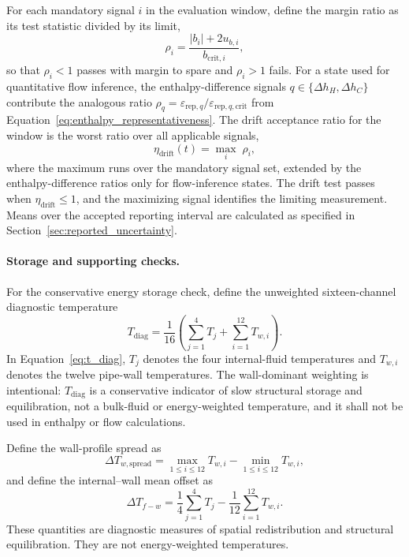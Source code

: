 \documentclass[11pt]{article}
\newcommand{\Tdiag}{T_{\mathrm{diag}}}
\begin{document}
For each mandatory signal $i$ in the evaluation window, define the margin
ratio as its test statistic divided by its limit,
\begin{equation}
    \rho_i
    =
    \frac{|b_i|+2u_{b,i}}{b_{\mathrm{crit},i}},
    \label{eq:margin_ratio}
\end{equation}
so that $\rho_i<1$ passes with margin to spare and $\rho_i>1$ fails. For a
state used for quantitative flow inference, the enthalpy-difference signals
$q\in\{\Delta h_H,\Delta h_C\}$ contribute the analogous ratio
$\rho_q=\varepsilon_{\mathrm{rep},q}/\varepsilon_{\mathrm{rep},q,\mathrm{crit}}$
from Equation~\eqref{eq:enthalpy_representativeness}. The drift acceptance
ratio for the window is the worst ratio over all applicable signals,
\begin{equation}
    \eta_{\mathrm{drift}}(t)
    =
    \max_{i}\;\rho_i,
    \label{eq:accept_ratio}
\end{equation}
where the maximum runs over the mandatory signal set, extended by the
enthalpy-difference ratios only for flow-inference states. The drift test
passes when $\eta_{\mathrm{drift}}\leq1$, and the maximizing signal
identifies the limiting measurement. Means over the accepted reporting
interval are calculated as specified in Section~\ref{sec:reported_uncertainty}.

\paragraph{Storage and supporting checks.}
For the conservative energy storage check, define the unweighted sixteen-channel diagnostic temperature
\begin{equation}
    \Tdiag
    =
    \frac{1}{16}
    \left(
        \sum_{j=1}^{4}T_j
        +
        \sum_{i=1}^{12}T_{w,i}
    \right).
    \label{eq:t_diag}
\end{equation}
In Equation~\eqref{eq:t_diag}, $T_j$ denotes the four internal-fluid temperatures and $T_{w,i}$ denotes the twelve pipe-wall temperatures. The wall-dominant weighting is intentional: $\Tdiag$ is a conservative indicator of slow structural storage and equilibration, not a bulk-fluid or energy-weighted temperature, and it shall not be used in enthalpy or flow calculations.

Define the wall-profile spread as
\begin{equation}
    \Delta T_{w,\mathrm{spread}}
    =
    \max_{1\leq i\leq12}T_{w,i}
    -
    \min_{1\leq i\leq12}T_{w,i},
    \label{eq:wall_spread}
\end{equation}
and define the internal--wall mean offset as
\begin{equation}
    \Delta T_{f-w}
    =
    \frac{1}{4}\sum_{j=1}^{4}T_j
    -
    \frac{1}{12}\sum_{i=1}^{12}T_{w,i}.
    \label{eq:fluid_wall_offset}
\end{equation}
These quantities are diagnostic measures of spatial redistribution and structural equilibration. They are not energy-weighted temperatures.
\end{document}
